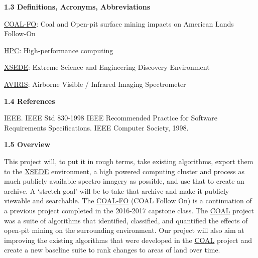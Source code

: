 \documentclass[a4paper,12pt]{article}
\begin{document}
\noindent \textbf{1.3 Definitions, Acronyms, Abbreviations}\newline


\noindent \href{http://eecs.oregonstate.edu/capstone/submission/?page=preview\&pid=320}{COAL-FO}: Coal and Open-pit surface mining impacts on American Lands Follow-On\newline


\noindent \href{https://en.wikipedia.org/wiki/Supercomputer}{HPC}: High-performance computing\newline


\noindent \href{https://www.xsede.org/}{XSEDE}: Extreme Science and Engineering Discovery Environment\newline


\noindent \href{https://aviris.jpl.nasa.gov/}{AVIRIS}: Airborne Visible / Infrared Imaging Spectrometer\newline


\noindent \textbf{1.4 References}\newline

IEEE. IEEE Std 830-1998 IEEE Recommended Practice for Software Requirements Specifications. IEEE Computer Society, 1998.\newline


\noindent \textbf{1.5 Overview}\newline


\noindent This project will, to put it in rough terms, take existing algorithms, export them to the \href{https://www.xsede.org/}{XSEDE} environment, a high powered computing cluster and process as much publicly available spectro imagery as possible, and use that to create an archive. A ‘stretch goal’ will be to take that archive and make it publicly viewable and searchable. The \href{http://eecs.oregonstate.edu/capstone/submission/?page=preview\&pid=320}{COAL-FO} (COAL Follow On) is a continuation of a previous project completed in the 2016-2017 capstone class. The \href{https://capstone-coal.github.io/}{COAL} project was a suite of algorithms that identified, classified, and quantified the effects of open-pit mining on the surrounding environment. Our project will also aim at improving the existing algorithms that were developed in the \href{https://capstone-coal.github.io/}{COAL} project and create a new baseline suite to rank changes to areas of land over time. \newline


\newline
\end{document}
